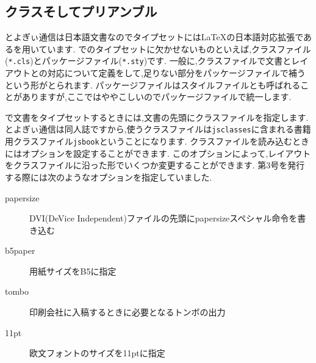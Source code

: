\subsection{クラスそしてプリアンブル}

とよぎぃ通信は日本語文書なのでタイプセットには{\LaTeX}の日本語対応拡張である{\pLaTeX}を用いています.
{\pLaTeX}でのタイプセットに欠かせないものといえば,クラスファイル(\texttt{*.cls})とパッケージファイル(\texttt{*.sty})です.
一般に,クラスファイルで文書とレイアウトとの対応について定義をして,足りない部分をパッケージファイルで補うという形がとられます.
パッケージファイルはスタイルファイルとも呼ばれることがありますが,ここではややこしいのでパッケージファイルで統一します.

{\pLaTeX}で文書をタイプセットするときには,文書の先頭にクラスファイルを指定します.
とよぎぃ通信は同人誌ですから,使うクラスファイルは\texttt{jsclasses}に含まれる書籍用クラスファイル\texttt{jsbook}ということになります.
クラスファイルを読み込むときにはオプションを設定することができます.
このオプションによって,レイアウトをクラスファイルに沿った形でいくつか変更することができます.
第3号を発行する際には次のようなオプションを指定していました.
\begin{description}
	\item[papersize] DVI(DeVice Independent)ファイルの先頭にpapersizeスペシャル命令を書き込む
	\item[b5paper] 用紙サイズをB5に指定
	\item[tombo] 印刷会社に入稿するときに必要となるトンボの出力
	\item[11pt] 欧文フォントのサイズを11ptに指定
\end{description}

